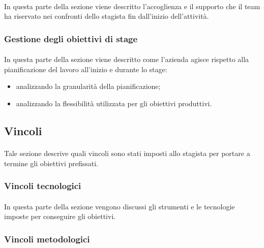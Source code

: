 \documentclass[
article,
10pt, %
oneside, %
BCOR5mm, %
]{scrartcl}
\begin{document}
\paragraph{} In questa parte della sezione viene descritto l'accoglienza e il
supporto che il team ha riservato nei confronti dello stagista fin dall'inizio
dell'attività.

\subsubsection{Gestione degli obiettivi di stage}

\paragraph{} In questa parte della sezione viene descritto come l'azienda
agisce rispetto alla pianificazione del lavoro all'inizio e durante lo stage:

\begin{itemize}
\item analizzando la granularità della pianificazione;
\item analizzando la flessibilità utilizzata per gli obiettivi produttivi.
\end{itemize}

\subsection{Vincoli}

\paragraph{} Tale sezione descrive quali vincoli sono stati imposti allo
stagista per portare a termine gli obiettivi prefissati.

\subsubsection{Vincoli tecnologici}

\paragraph{} In questa parte della sezione vengono discussi gli strumenti e le
tecnologie imposte per conseguire gli obiettivi.

\subsubsection{Vincoli metodologici}
\end{document}
